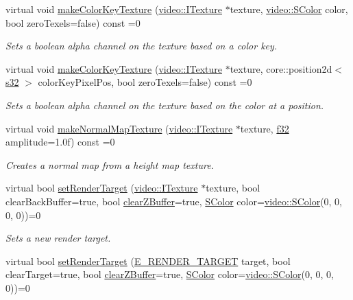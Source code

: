 \begin{DoxyCompactItemize}
virtual void \hyperlink{classirr_1_1video_1_1IVideoDriver_a701e7d2101eb26888f57928134bc2ffb}{make\+Color\+Key\+Texture} (\hyperlink{classirr_1_1video_1_1ITexture}{video\+::\+I\+Texture} $\ast$texture, \hyperlink{classirr_1_1video_1_1SColor}{video\+::\+S\+Color} color, bool zero\+Texels=false) const =0
\begin{DoxyCompactList}\small\item\em Sets a boolean alpha channel on the texture based on a color key. \end{DoxyCompactList}\item 
virtual void \hyperlink{classirr_1_1video_1_1IVideoDriver_aed772902f4fe1185b44ce81b9b0b9add}{make\+Color\+Key\+Texture} (\hyperlink{classirr_1_1video_1_1ITexture}{video\+::\+I\+Texture} $\ast$texture, core\+::position2d$<$ \hyperlink{namespaceirr_ac66849b7a6ed16e30ebede579f9b47c6}{s32} $>$ color\+Key\+Pixel\+Pos, bool zero\+Texels=false) const =0
\begin{DoxyCompactList}\small\item\em Sets a boolean alpha channel on the texture based on the color at a position. \end{DoxyCompactList}\item 
virtual void \hyperlink{classirr_1_1video_1_1IVideoDriver_a6470e31c1aaf2c0fa5e5a5b3f8f092e0}{make\+Normal\+Map\+Texture} (\hyperlink{classirr_1_1video_1_1ITexture}{video\+::\+I\+Texture} $\ast$texture, \hyperlink{namespaceirr_a0277be98d67dc26ff93b1a6a1d086b07}{f32} amplitude=1.\+0f) const =0
\begin{DoxyCompactList}\small\item\em Creates a normal map from a height map texture. \end{DoxyCompactList}\item 
virtual bool \hyperlink{classirr_1_1video_1_1IVideoDriver_a8c38a8d8d6d49be53bda55eb0749e7eb}{set\+Render\+Target} (\hyperlink{classirr_1_1video_1_1ITexture}{video\+::\+I\+Texture} $\ast$texture, bool clear\+Back\+Buffer=true, bool \hyperlink{classirr_1_1video_1_1IVideoDriver_a2036fe0a27dbd1a123ff5aedb07373a5}{clear\+Z\+Buffer}=true, \hyperlink{classirr_1_1video_1_1SColor}{S\+Color} color=\hyperlink{classirr_1_1video_1_1SColor}{video\+::\+S\+Color}(0, 0, 0, 0))=0
\begin{DoxyCompactList}\small\item\em Sets a new render target. \end{DoxyCompactList}\item 
virtual bool \hyperlink{classirr_1_1video_1_1IVideoDriver_ad75e7606ab186f1e31cc126bcaaeba9c}{set\+Render\+Target} (\hyperlink{namespaceirr_1_1video_a5b61a3f2bd5d458f76f2eb20b0f40972}{E\+\_\+\+R\+E\+N\+D\+E\+R\+\_\+\+T\+A\+R\+G\+ET} target, bool clear\+Target=true, bool \hyperlink{classirr_1_1video_1_1IVideoDriver_a2036fe0a27dbd1a123ff5aedb07373a5}{clear\+Z\+Buffer}=true, \hyperlink{classirr_1_1video_1_1SColor}{S\+Color} color=\hyperlink{classirr_1_1video_1_1SColor}{video\+::\+S\+Color}(0, 0, 0, 0))=0

\end{DoxyCompactItemize}
